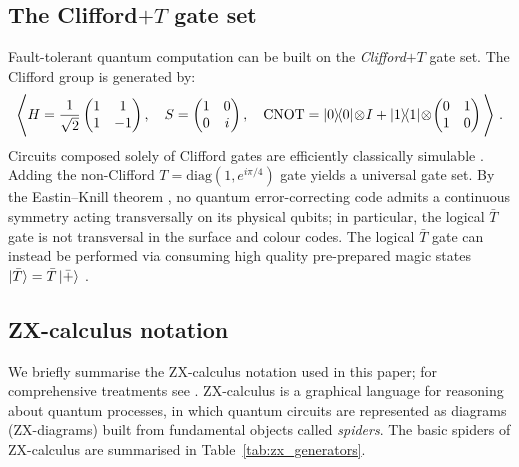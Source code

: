 \documentclass[a4paper,onecolumn,11pt,accepted=2026-06-10]{quantumarticle}
\begin{document}
\subsection{The Clifford$+T$ gate set}

Fault-tolerant quantum computation can be built on the \textit{Clifford$+T$} gate set. The Clifford group is generated by:
\begin{equation}
\label{eq:clifford_gp}
\Bigg\langle H = \frac{1}{\sqrt{2}}\begin{pmatrix} 1 & 1 \\ 1 & -1 \end{pmatrix}, \quad
S = \begin{pmatrix} 1 & 0 \\ 0 & i \end{pmatrix}, \quad
\mathrm{CNOT} = \ketbra{0}{0}\!\otimes\! I + \ketbra{1}{1}\!\otimes\! \begin{pmatrix} 0 & 1 \\ 1 & 0 \end{pmatrix} \nonumber \Bigg\rangle \ .
\end{equation}
Circuits composed solely of Clifford gates are efficiently classically simulable \cite{gottesman1998heisenbergrepresentationquantumcomputers, Aaronson_2004}. Adding the non-Clifford $T = \mathrm{diag}(1,e^{i\pi/4})$ gate yields a universal gate set. By the Eastin--Knill theorem \cite{eastin2009restrictions}, 
no quantum error-correcting code admits a continuous symmetry acting transversally on its physical qubits; in particular, the logical $\bar{T}$ gate is not transversal in the surface and colour codes. The logical $\bar{T}$ gate can instead be performed via consuming high quality pre-prepared magic states $\ket{\bar{T}} = \bar{T}\ket{\bar{+}}$ \cite{Bravyi_2005,Litinski2019game,Litinski_2019}.

\subsection{ZX-calculus notation}

We briefly summarise the ZX-calculus notation used in this paper; for comprehensive treatments see \cite{coecke2017picturing, vandewetering2020zxcalculus, KissingerWetering2024Book}. ZX-calculus is a graphical language for reasoning about quantum processes, in which quantum circuits are represented as diagrams (ZX-diagrams) built from fundamental objects called \textit{spiders}. The basic spiders of ZX-calculus are summarised in Table~\ref{tab:zx_generators}.
\end{document}
